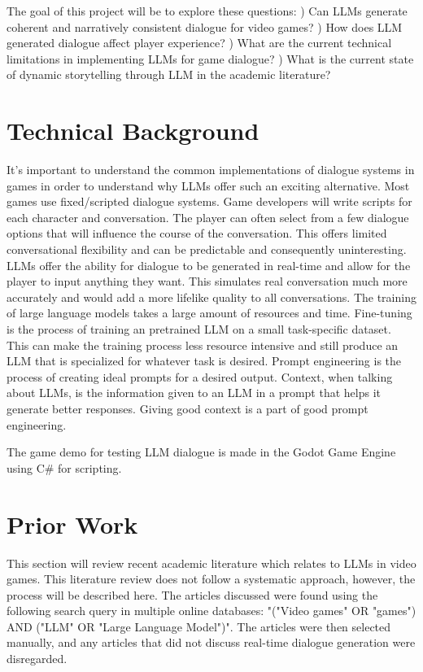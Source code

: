 \documentclass[10pt,twocolumn]{article}
\begin{document}
    \par 
    The goal of this project will be to explore these questions:
        ) Can LLMs generate coherent and narratively consistent dialogue for video games? 
        ) How does LLM generated dialogue affect player experience?
        ) What are the current technical limitations in implementing LLMs for game dialogue?
        ) What is the current state of dynamic storytelling through LLM in the academic literature?
    
\section{Technical Background}
    
    \par
    It's important to understand the common implementations of dialogue systems in games in order to understand why LLMs offer such an exciting alternative. Most games use fixed/scripted dialogue systems. Game developers will write scripts for each character and conversation. The player can often select from a few dialogue options that will influence the course of the conversation. This offers limited conversational flexibility and can be predictable and consequently uninteresting. LLMs offer the ability for dialogue to be generated in real-time and allow for the player to input anything they want. This simulates real conversation much more accurately and would add a more lifelike quality to all conversations. The training of large language models takes a large amount of resources and time. Fine-tuning is the process of training an pretrained LLM on a small task-specific dataset. This can make the training process less resource intensive and still produce an LLM that is specialized for whatever task is desired. Prompt engineering is the process of creating ideal prompts for a desired output. Context, when talking about LLMs, is the information given to an LLM in a prompt that helps it generate better responses. Giving good context is a part of good prompt engineering. 
    
    \par 
    The game demo for testing LLM dialogue is made in the Godot Game Engine using C\# for scripting. 

\section{Prior Work}

    \par
    This section will review recent academic literature which relates to LLMs in video games. This literature review does not follow a systematic approach, however, the process will be described here. The articles discussed were found using the following search query in multiple online databases: "("Video games" OR "games") AND ("LLM" OR "Large Language Model")". The articles were then selected manually, and any articles that did not discuss real-time dialogue generation were disregarded. 
\end{document}
